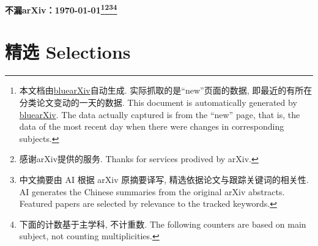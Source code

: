\documentclass[9pt, a4paper]{article}
\theoremstyle{plain}
\theoremstyle{definition}
\theoremstyle{remark}
\begin{document}
\begin{center}
    \Huge\textbf{不漏arXiv：\today \footnote{本文档由\href{https://github.com/vegetablefj/bluearXiv-ai}{bluearXiv}自动生成. 实际抓取的是``new''页面的数据, 即最近的有所在分类论文变动的一天的数据. This document is automatically generated by \href{https://github.com/vegetablefj/bluearXiv-ai}{bluearXiv}. The data actually captured is from the ``new'' page, that is, the data of the most recent day when there were changes in corresponding subjects.}\footnote{感谢arXiv提供的服务. Thanks for services prodived by arXiv.}\footnote{中文摘要由 AI 根据 arXiv 原摘要译写, 精选依据论文与跟踪关键词的相关性. AI generates the Chinese summaries from the original arXiv abstracts. Featured papers are selected by relevance to the tracked keywords.}\footnote{下面的计数基于主学科, 不计重数. The following counters are based on main subject, not counting multiplicities.}}
\end{center}

\begin{center}

\end{center}

\setcounter{section}{-1}
\section{精选 Selections}


    
    

\end{document}
